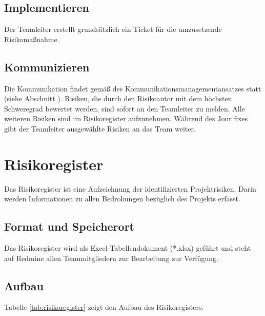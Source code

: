 \documentclass[a4paper,11pt,listof=numbered,glossary=totoc,parskip=half]{scrreprt}
\begin{document}
\subsection{Implementieren}

Der Teamleiter erstellt grundsätzlich ein Ticket für die umzusetzende Risikomaßnahme.

\subsection{Kommunizieren}

Die Kommunikation findet gemäß des Kommunikationsmanagementansatzes statt (siehe Abschnitt ). Risiken, die durch den Risikoautor mit dem höchsten Schweregrad bewertet werden, sind sofort an den Teamleiter zu melden. Alle weiteren Risiken sind im Risikoregister aufzunehmen. Während des Jour fixes gibt der Teamleiter ausgewählte Risiken an das Team weiter.

\section{Risikoregister}
\label{subsec:risikoregister}

Das Risikoregister ist eine Aufzeichnung der identifizierten Projektrisiken. Darin werden Informationen zu allen Bedrohungen bezüglich des Projekts erfasst.

\subsection{Format und Speicherort}

Das Risikoregister wird als Excel-Tabellendokument (*.xlsx) geführt und steht auf Redmine allen Teammitgliedern zur Bearbeitung zur Verfügung.

\subsection{Aufbau}


Tabelle \ref{tab:risikoregister} zeigt den Aufbau des Risikoregisters.
\end{document}
